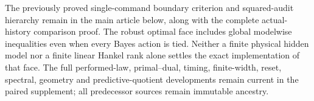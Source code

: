 The previously proved single-command boundary criterion and squared-audit hierarchy remain in the main article below, along with the complete actual-history comparison proof. The robust optimal face includes global modelwise inequalities even when every Bayes action is tied. Neither a finite physical hidden model nor a finite linear Hankel rank alone settles the exact implementation of that face. The full performed-law, primal--dual, timing, finite-width, reset, spectral, geometry and predictive-quotient developments remain current in the paired supplement; all predecessor sources remain immutable ancestry.
